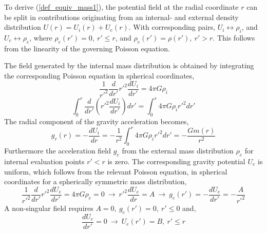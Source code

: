 To derive (\ref{def_equiv_mass1}), the potential field at the 
radial coordinate $r$ 
can be split in contributions originating from an internal- and external density 
distribution $U(r) = U_i (r) + U_e (r)$.
With corresponding pairs, 
$U_i \leftrightarrow \rho_i$, 
and
$U_e \leftrightarrow \rho_e$,
where
$\rho_e(r') = 0, ~r' \le r$,
and
$\rho_e(r') = \rho(r'), ~r' > r$.
This follows from the linearity of the governing Poisson equation.

The field generated by the internal mass distribution is obtained
by integrating the corresponding Poisson equation in spherical 
coordinates,
\begin{equation}
  \frac{1}{r'^2}
  \frac{d}{dr'} r'^2
  \frac{dU_i}{dr'}
   =
  4\pi G \rho_i
\end{equation}
\begin{equation}
  \int_0^r
      \frac{d}{dr'} \left ( r'^2 \frac{dU_i}{dr'} \right ) dr'
   =
  \int_0^r 4\pi G \rho_i r'^2 dr'
\end{equation}
The radial component of the gravity acceleration becomes,
\begin{equation}
   g_r(r) = - \frac{dU_i}{dr} 
          = - \frac{1}{r^2} \int_0^r 4\pi G \rho_i r'^2 dr'
          = - \frac{Gm(r)}{r^2}
\label{eqn_g_rad_comp}
\end{equation}
Furthermore the acceleration field $g_e$ from the external
mass distribution $\rho_e$ for internal evaluation points
$r'<r$ is zero.
The corresponding gravity potential $U_e$ is uniform,
which follows from the relevant Poisson equation,
in spherical coordinates for a spherically symmetric mass distribution,
\begin{equation}
   \frac{1}{r'^2} \frac{d}{dr'} r'^2 \frac{dU_e}{dr'}
    =
   4\pi G \rho_e 
    = 0
   ~\rightarrow~ 
   r'^2 \frac{dU_e}{dr} = A
   ~\rightarrow~ 
   g_e(r') = - \frac{dU_e}{dr'} = -\frac{A}{r'^2}
\end{equation}
A non-singular field requires $A=0,~g_e(r')=0,~r' \le 0$ and,
\begin{equation}
   \frac{dU_e}{dr'} = 0 ~\rightarrow~ U_e(r') = B,~r' \le r
\end{equation}




\vspace{0.5cm}

